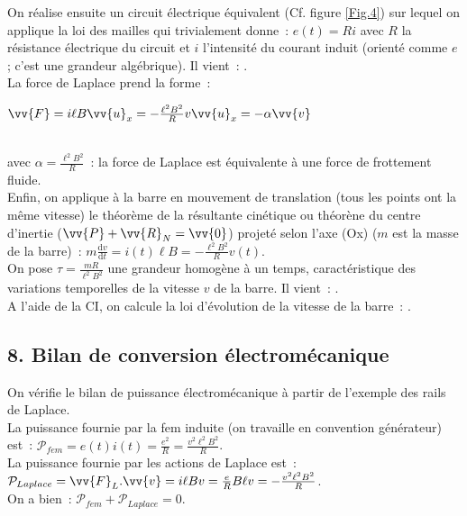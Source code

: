 \documentclass{article}
\newcommand{\mathcolorbox}[2]{\colorbox{#1}{$#2$}}
\renewcommand\overrightarrow{\vv}
\begin{document}
\begin{itemize}
On réalise ensuite un circuit électrique équivalent (Cf. figure
\ref{Fig.4}) sur lequel on applique la loi des mailles qui
trivialement donne : $e\left(t\right) = Ri$ avec $R$ la résistance électrique
du circuit et $i$ l'intensité du courant induit (orienté comme $e$ ;
c'est une grandeur algébrique).
Il vient : . \\
La force de Laplace prend la forme : \\
\centerline{\mathcolorbox{gray!20}{\overrightarrow{F} =i\ell B\overrightarrow{u}_{x} =
-\frac{\ell^{2}B^{2}}{R}v\overrightarrow{u}_{x} = -\alpha
\overrightarrow{v}}} \\
avec $\alpha = \frac{\ell^{2}B^{2}}{R}$ : la
force de Laplace est équivalente à une force de frottement fluide.
\\
Enfin, on applique à la barre en mouvement de translation (tous les
points ont la même vitesse) le théorème de la résultante cinétique
ou théorène du centre d'inertie
($\overrightarrow{P}+\overrightarrow{R}_{N} = \overrightarrow{0}$)
projeté selon l'axe (Ox) ($m$ est la masse de la barre) :
$m\frac{\mathrm{d}v}{\mathrm{d}t} = i\left(t\right)\ell B = -\frac{\ell^{2}B^{2}}{R}v\left(t\right)$. \\
On pose $\tau = \frac{mR}{\ell^{2}B^{2}}$ une grandeur homogène à un
temps, caractéristique des variations temporelles de la vitesse $v$
de la barre. Il vient : .
\\
A l'aide de la CI, on calcule la loi d'évolution de la vitesse de la
barre : .
\end{itemize}

\subsection*{8. Bilan de conversion électromécanique}
On vérifie le bilan de puissance électromécanique à partir de
l'exemple des rails de Laplace. \\
La puissance fournie par la fem induite (on travaille en convention
générateur) est : $\mathcal{P}_{fem} =
e\left(t\right)i\left(t\right) = \frac{e^{2}}{R} = \frac{v^{2}\ell^{2}B^{2}}{R}$. \\
La puissance fournie par les actions de Laplace est :
$\mathcal{P}_{Laplace} = \overrightarrow{F}_{L}.\overrightarrow{v} =
i\ell B v = \frac{e}{R}B\ell v = -\frac{v^{2}\ell^{2} B^{2}}{R}$. \\
On a bien : $\mathcal{P}_{fem}+\mathcal{P}_{Laplace} = 0$.
\end{document}
